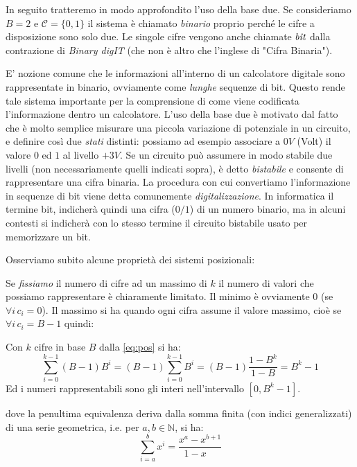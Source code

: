 In seguito tratteremo in modo approfondito l'uso della base due. Se consideriamo $B = 2$ e $\mathcal{C} = \{ 0, 1 \}$ il sistema è
chiamato \emph{binario} proprio perché le cifre a disposizione sono solo due.
Le singole cifre vengono anche chiamate $\emph{bit}$ dalla contrazione di
\emph{Binary digIT} (che non è altro che l'inglese di "Cifra
Binaria").

E' nozione comune che le informazioni all'interno di un calcolatore digitale
sono rappresentate in binario, ovviamente come \emph{lunghe} sequenze di bit.
Questo rende tale sistema importante per la comprensione di come viene
codificata l'informazione dentro un calcolatore. L'uso della base due è
motivato dal fatto che è molto semplice misurare una piccola variazione di
potenziale in un circuito, e definire così due \emph{stati} distinti: possiamo ad
esempio associare a $0V$ (Volt) il valore $0$ ed $1$ al livello $+3V$. Se un
circuito può assumere in modo stabile due livelli (non necessariamente quelli
indicati sopra), è detto \emph{bistabile} e consente di rappresentare una cifra
binaria. La procedura con cui convertiamo l'informazione in sequenze di bit
viene detta comunemente \emph{digitalizzazione}. In informatica il termine bit,
indicherà quindi una cifra ($0/1$) di un numero binario, ma in alcuni contesti
si indicherà con lo stesso termine il circuito bistabile usato per memorizzare
un bit.

Osserviamo subito alcune proprietà dei sistemi posizionali:

Se \emph{fissiamo} il numero di cifre ad un massimo di $k$ il numero di valori
che possiamo rappresentare è chiaramente limitato. Il minimo è ovviamente $0$
(se $\forall i \, c_i = 0$). Il massimo si ha quando ogni  cifra assume il valore
massimo, cioè se $\forall i\, c_i = B-1$ quindi:

\begin{observe} Con $k$ cifre in base $B$ dalla \eqref{eq:pos} si ha:
\begin{equation}\label{eq:range} \sum_{i=0}^{k-1} (B-1)B^i = (B-1)
\sum_{i=0}^{k-1} B^i = (B-1) \frac{1-B^k}{1-B} = B^k-1 \end{equation} Ed i
numeri rappresentabili sono gli interi nell'intervallo $[0,B^k-1]$.
\end{observe}

\noindent dove la penultima equivalenza deriva dalla somma finita (con indici
generalizzati) di una serie geometrica, i.e. per $a,b \in \mathbb{N}$, si ha:
\[ \sum_{i=a}^{b} x^i = \frac{x^a-x^{b+1}}{1-x\quad} \]

